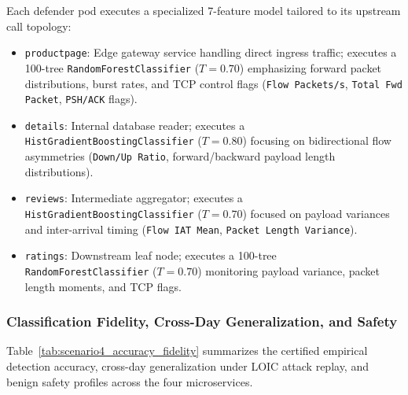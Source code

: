 Each defender pod executes a specialized 7-feature model tailored to its upstream call topology:
\begin{itemize}
    \item \texttt{productpage}: Edge gateway service handling direct ingress traffic; executes a 100-tree \texttt{RandomForestClassifier} ($T=0.70$) emphasizing forward packet distributions, burst rates, and TCP control flags (\texttt{Flow Packets/s}, \texttt{Total Fwd Packet}, \texttt{PSH/ACK} flags).
    \item \texttt{details}: Internal database reader; executes a \texttt{HistGradientBoostingClassifier} ($T=0.80$) focusing on bidirectional flow asymmetries (\texttt{Down/Up Ratio}, forward/backward payload length distributions).
    \item \texttt{reviews}: Intermediate aggregator; executes a \texttt{HistGradientBoostingClassifier} ($T=0.70$) focused on payload variances and inter-arrival timing (\texttt{Flow IAT Mean}, \texttt{Packet Length Variance}).
    \item \texttt{ratings}: Downstream leaf node; executes a 100-tree \texttt{RandomForestClassifier} ($T=0.70$) monitoring payload variance, packet length moments, and TCP flags.
\end{itemize}

\subsubsection{Classification Fidelity, Cross-Day Generalization, and Safety}
Table~\ref{tab:scenario4_accuracy_fidelity} summarizes the certified empirical detection accuracy, cross-day generalization under LOIC attack replay, and benign safety profiles across the four microservices. 

